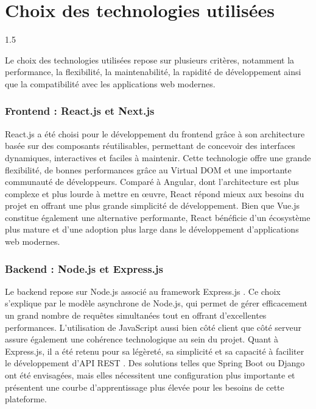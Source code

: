\documentclass[a4paper,12pt]{report}
\begin{document}
\section{Choix des technologies utilisées}
\vspace{0.5cm}
\begin{spacing}{1.5}
\justifying

Le choix des technologies utilisées repose sur plusieurs critères, notamment la performance, la flexibilité, la maintenabilité, la rapidité de développement ainsi que la compatibilité avec les applications web modernes.

\subsubsection{Frontend : React.js et Next.js}

React.js \cite{reactdocs} a été choisi pour le développement du frontend grâce à son architecture basée sur des composants réutilisables, permettant de concevoir des interfaces dynamiques, interactives et faciles à maintenir. Cette technologie offre une grande flexibilité, de bonnes performances grâce au Virtual DOM et une importante communauté de développeurs. Comparé à Angular, dont l'architecture est plus complexe et plus lourde à mettre en œuvre, React répond mieux aux besoins du projet en offrant une plus grande simplicité de développement. Bien que Vue.js constitue également une alternative performante, React bénéficie d'un écosystème plus mature et d'une adoption plus large dans le développement d'applications web modernes.

\subsubsection{Backend : Node.js et Express.js} 

Le backend repose sur Node.js \cite{nodejs} associé au framework Express.js \cite{expressjs}. Ce choix s'explique par le modèle asynchrone de Node.js, qui permet de gérer efficacement un grand nombre de requêtes simultanées tout en offrant d'excellentes performances. L'utilisation de JavaScript aussi bien côté client que côté serveur assure également une cohérence technologique au sein du projet. Quant à Express.js, il a été retenu pour sa légèreté, sa simplicité et sa capacité à faciliter le développement d'API REST \cite{fielding2000}. Des solutions telles que Spring Boot ou Django ont été envisagées, mais elles nécessitent une configuration plus importante et présentent une courbe d'apprentissage plus élevée pour les besoins de cette plateforme.


\end{spacing}
\end{document}
